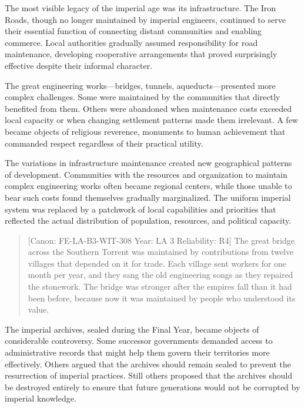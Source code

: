 The most visible legacy of the imperial age was its infrastructure. The
Iron Roads, though no longer maintained by imperial engineers, continued
to serve their essential function of connecting distant communities and
enabling commerce. Local authorities gradually assumed responsibility
for road maintenance, developing cooperative arrangements that proved
surprisingly effective despite their informal character.

The great engineering works---bridges, tunnels, aqueducts---presented
more complex challenges. Some were maintained by the communities that
directly benefited from them. Others were abandoned when maintenance
costs exceeded local capacity or when changing settlement patterns made
them irrelevant. A few became objects of religious reverence, monuments
to human achievement that commanded respect regardless of their
practical utility.

The variations in infrastructure maintenance created new geographical
patterns of development. Communities with the resources and organization
to maintain complex engineering works often became regional centers,
while those unable to bear such costs found themselves gradually
marginalized. The uniform imperial system was replaced by a patchwork of
local capabilities and priorities that reflected the actual distribution
of population, resources, and political capacity.

\begin{quote}
{[}Canon: FE-LA-B3-WIT-308 \textbar{} Year: LA 3 \textbar{} Reliability:
R4{]} The great bridge across the Southern Torrent was maintained by
contributions from twelve villages that depended on it for trade. Each
village sent workers for one month per year, and they sang the old
engineering songs as they repaired the stonework. The bridge was
stronger after the empire\textquotesingle s fall than it had been
before, because now it was maintained by people who understood its
value.
\end{quote}

The imperial archives, sealed during the Final Year, became objects of
considerable controversy. Some successor governments demanded access to
administrative records that might help them govern their territories
more effectively. Others argued that the archives should remain sealed
to prevent the resurrection of imperial practices. Still others proposed
that the archives should be destroyed entirely to ensure that future
generations would not be corrupted by imperial knowledge.

